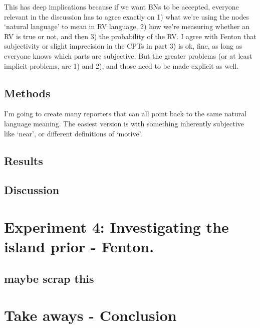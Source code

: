 This has deep implications because if we want BNs to be accepted, everyone relevant in the discussion has to agree exactly on 1) what we're using the nodes `natural language' to mean in RV language, 2) how we're measuring whether an RV is true or not, and then 3) the probability of the RV. I agree with Fenton that subjectivity or slight imprecision in the CPTs in part 3) is ok, fine, as long as everyone knows which parts are subjective. But the greater problems (or at least implicit problems, are 1) and 2), and those need to be made explicit as well.

\subsection{Methods}
I'm going to create many reporters that can all point back to the same natural language meaning. The easiest version is with something inherently subjective like `near', or different definitions of `motive'.

\subsection{Results}

\subsection{Discussion}



\section{Experiment 4: Investigating the island prior - Fenton.}
\subsection{maybe scrap this}
\section{Take aways - Conclusion}


